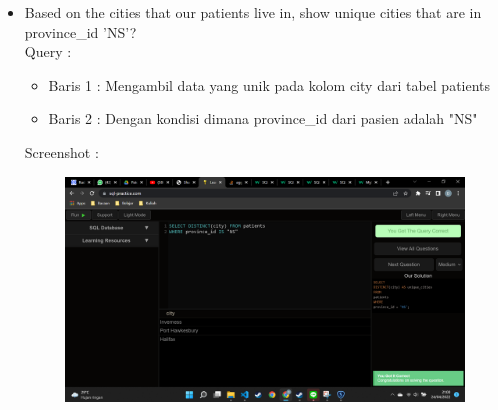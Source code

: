 \documentclass[]{article}
\begin{document}
\begin{itemize}
        \item Based on the cities that our patients live in, show unique cities that are in province\_id 'NS'?
        \\Query :
        
        \begin{itemize}
            \item Baris 1 : Mengambil data yang unik pada kolom city dari tabel patients  
            \item Baris 2 : Dengan kondisi dimana province\_id dari pasien adalah "NS"
        \end{itemize}
        Screenshot :
        \begin{figure}[h]
            \includegraphics[scale=0.3]{./Screenshot/Medium-17.png}
            \centering
        \end{figure}

    \end{itemize}
\end{document}
